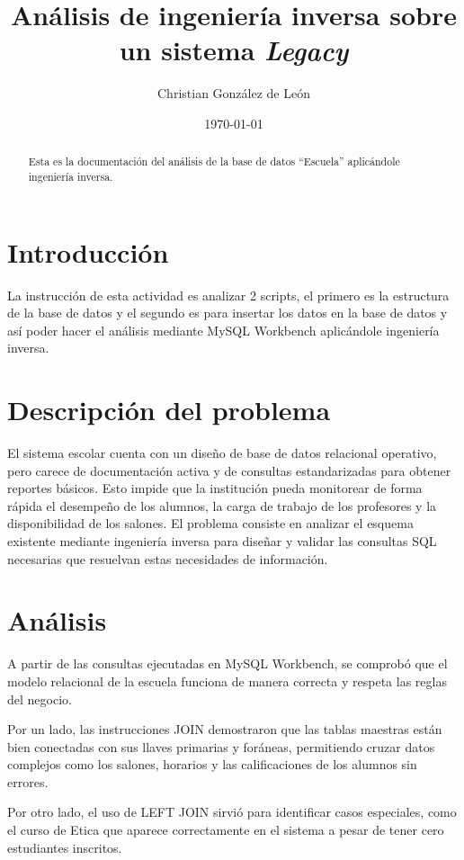 \documentclass[11pt,letterpaper]{article}
\author{Christian González de León}
\title{Análisis de ingeniería inversa sobre un sistema \textit{Legacy}}
\date{\today}
\begin{document}
\maketitle

\begin{abstract}
Esta es la documentación del análisis de la base de datos ``Escuela'' aplicándole ingeniería inversa.
\end{abstract}

\section{Introducción}
La instrucción de esta actividad es analizar 2 scripts, el primero es la estructura de la base de datos y el segundo es para insertar los datos en la base de datos y así poder hacer el análisis mediante MySQL Workbench aplicándole ingeniería inversa.

\section{Descripción del problema}
El sistema escolar cuenta con un diseño de base de datos relacional operativo, pero carece de documentación activa y de consultas estandarizadas para obtener reportes básicos. Esto impide que la institución pueda monitorear de forma rápida el desempeño de los alumnos, la carga de trabajo de los profesores y la disponibilidad de los salones. El problema consiste en analizar el esquema existente mediante ingeniería inversa para diseñar y validar las consultas SQL necesarias que resuelvan estas necesidades de información.

\section{Análisis}
A partir de las consultas ejecutadas en MySQL Workbench, se comprobó que el modelo relacional de la escuela funciona de manera correcta y respeta las reglas del negocio.

Por un lado, las instrucciones JOIN demostraron que las tablas maestras están bien conectadas con sus llaves primarias y foráneas, permitiendo cruzar datos complejos como los salones, horarios y las calificaciones de los alumnos sin errores.

Por otro lado, el uso de LEFT JOIN sirvió para identificar casos especiales, como el curso de Etica que aparece correctamente en el sistema a pesar de tener cero estudiantes inscritos.
\end{document}
